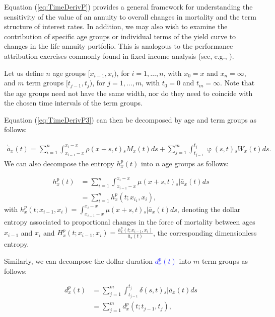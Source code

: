\documentclass[12pt]{article}
\newcommand{\revision}[1]{\textcolor{blue}{#1}}
\begin{document}
 
 Equation (\ref{eq:TimeDerivP}) provides a general framework for understanding the sensitivity of the value of an annuity to overall changes in mortality and the term structure of interest rates. In addition, we may also wish to examine the contribution of specific age groups or individual terms of the yield curve to changes in the life annuity portfolio. This is analogous to the performance attribution exercises commonly found in fixed income analysis (see, e.g., \citet{Daul2012}).
 
 Let us define $n$ age groups $[x_{i-1}, x_i)$, for $i=1,\ldots,n$, with $x_0 = x$ and $x_n = \infty$, and $m$ term groups $[t_{j-1}, t_j)$, for $j=1,\ldots,m$, with $t_0 = 0$ and $t_m = \infty$.
 \color{blue} Note that the age groups need not have the same width, nor do they need to coincide with the chosen time intervals of the term groups. \color{black}
 
 Equation (\ref{eq:TimeDerivP3}) can then be decomposed by age and term groups as follows:
 

\begin{equation}\label{eq:TimeDerivAge}
\begin{split}
 \acute{\bar{a}}_x(t) = \sum_{i=1}^n\int_{x_{i-1}-x}^{x_i-x}  \rho(x+s,t) {}_sM_x(t)  ds +\sum_{j=1}^m\int_{t_{j-1}}^{t_j}   \upvarphi(s,t) {}_sW_x(t)  ds.  
\end{split}
\end{equation}
We can also decompose the entropy $h_x^p(t)$ into $n$ age groups as follows:

\begin{equation} \label{eq:EntropyAge}
\begin{split}
{h}^{p}_{x}(t) &=  \sum_{i=1}^n\int_{x_{i-1}-x}^{x_i-x} \mu(x+s,t)   {}_s|\bar{a}_x(t) ds \\
&=  \sum_{i=1}^n {h}^{p}_{x}(t;x_{i_1},x_{i}),
\end{split}
\end{equation}
with ${h}^{p}_{x}(t;x_{i-1},x_{i})=\int_{x_{i-1}-x}^{x_i-x} \mu(x+s,t)   {}_s|\bar{a}_x(t) ds$, denoting the dollar entropy associated to proportional changes in the force of mortality between ages $x_{i-1}$ and $x_{i}$ and ${H}^{p}_{x}(t;x_{i-1},x_{i}) = \frac{{h}^{p}_{x}(t;x_{i-1},x_{i})}{\bar{a}_x(t)}$, the corresponding dimensionless entropy. 

Similarly, we can decompose the dollar duration \revision{${d}^{p}_{x}(t)$} into $m$ term groups as follows:

\begin{equation}\label{eq:DurationAge}
\begin{split}
{d}^{p}_{x}(t) &= \sum_{j=1}^m\int_{t_{j-1}}^{t_j} \delta(s,t) {}_s|\bar{a}_x(t)ds \\
&= \sum_{j=1}^m {d}^{p}_{x}(t;t_{j-1},t_{j}),
\end{split}
\end{equation}
\end{document}

